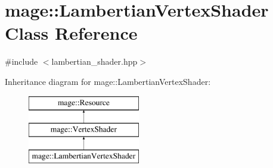 \hypertarget{classmage_1_1_lambertian_vertex_shader}{}\section{mage\+:\+:Lambertian\+Vertex\+Shader Class Reference}
\label{classmage_1_1_lambertian_vertex_shader}


{\ttfamily \#include $<$lambertian\+\_\+shader.\+hpp$>$}

Inheritance diagram for mage\+:\+:Lambertian\+Vertex\+Shader\+:\begin{figure}[H]
\begin{center}
\leavevmode
\includegraphics[height=3.000000cm]{classmage_1_1_lambertian_vertex_shader}
\end{center}
\end{figure}
